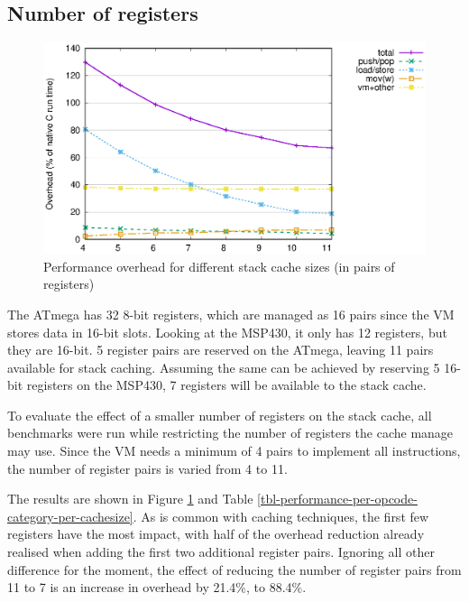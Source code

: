 \subsection{Number of registers}

\begin{figure}
\centering
\includegraphics[width=\mygraphsize]{cachesize-performance-per-opcode-category.eps}
\caption{Performance overhead for different stack cache sizes (in pairs of registers)}
\label{fig-performance-per-opcode-category-per-cachesize}
\end{figure}



The ATmega has 32 8-bit registers, which are managed as 16 pairs since the VM stores data in 16-bit slots. Looking at the MSP430, it only has 12 registers, but they are 16-bit. 5 register pairs are reserved on the ATmega, leaving 11 pairs available for stack caching. Assuming the same can be achieved by reserving 5 16-bit registers on the MSP430, 7 registers will be available to the stack cache.

To evaluate the effect of a smaller number of registers on the stack cache, all benchmarks were run while restricting the number of registers the cache manage may use. Since the VM needs a minimum of 4 pairs to implement all instructions, the number of register pairs is varied from 4 to 11.

The results are shown in Figure \ref{fig-performance-per-opcode-category-per-cachesize} and Table \ref{tbl-performance-per-opcode-category-per-cachesize}. As is common with caching techniques, the first few registers have the most impact, with half of the overhead reduction already realised when adding the first two additional register pairs. Ignoring all other difference for the moment, the effect of reducing the number of register pairs from 11 to 7 is an increase in overhead by 21.4\%, to 88.4\%.

